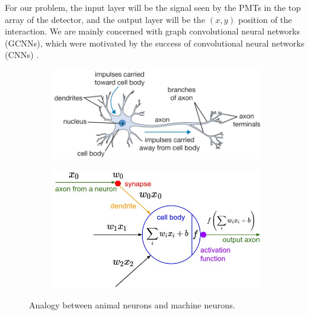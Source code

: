 \documentclass[../thesis.tex]{subfiles}
\begin{document}
\par For our problem, the input layer will be the signal seen by the PMTs in the top array of the detector, and the output layer will be the $(x,y)$ position of the interaction.
We are mainly concerned with graph convolutional neural networks (GCNNs), which were motivated by the success of convolutional neural networks (CNNs) \cite{GCNN_Kipf}.
\begin{figure}[t]
	\centering
	\begin{subfigure}{0.49\textwidth}
		\includegraphics[width=\textwidth]{figures/neuron.png}
	\end{subfigure}
	\hfill
	\begin{subfigure}{0.49\textwidth}
		\includegraphics[width=\textwidth]{figures/neuron_model.jpeg}
	\end{subfigure}
	\caption{
	Analogy between animal neurons and machine neurons. \cite{neuron-cartoon}
	}
	\label{fig:neuron-cartoon}
\end{figure}
\end{document}
